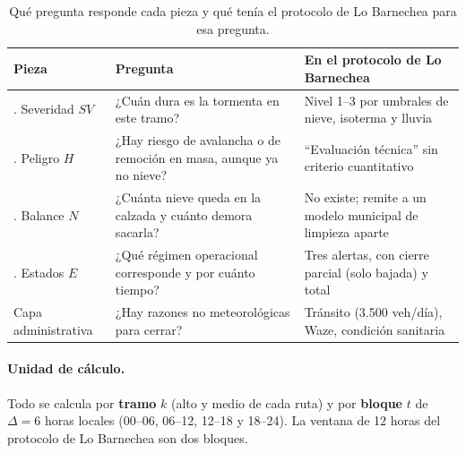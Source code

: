 \begin{table}[ht]
\centering\small
\caption{Qué pregunta responde cada pieza y qué tenía el protocolo de Lo Barnechea para esa pregunta.}
\label{tab:piezas}
\begin{tabularx}{\textwidth}{|>{\raggedright\arraybackslash}p{3.2cm}|>{\raggedright\arraybackslash}X|>{\raggedright\arraybackslash}X|}
\hline
Pieza & Pregunta & En el protocolo de Lo Barnechea \\ \hline
1. Severidad $SV$ & ¿Cuán dura es la tormenta en este tramo? & Nivel 1--3 por umbrales de nieve, isoterma y lluvia \\ \hline
2. Peligro $H$ & ¿Hay riesgo de avalancha o de remoción en masa, aunque ya no nieve? & ``Evaluación técnica'' sin criterio cuantitativo \\ \hline
3. Balance $N$ & ¿Cuánta nieve queda en la calzada y cuánto demora sacarla? & No existe; remite a un modelo municipal de limpieza aparte \\ \hline
4. Estados $E$ & ¿Qué régimen operacional corresponde y por cuánto tiempo? & Tres alertas, con cierre parcial (solo bajada) y total \\ \hline
Capa administrativa & ¿Hay razones no meteorológicas para cerrar? & Tránsito (3.500 veh/día), Waze, condición sanitaria \\ \hline
\end{tabularx}
\end{table}

\paragraph{Unidad de cálculo.} Todo se calcula por \textbf{tramo} $k$ (alto y medio de cada ruta) y por \textbf{bloque} $t$ de $\Delta = 6$ horas locales (00--06, 06--12, 12--18 y 18--24). La ventana de 12 horas del protocolo de Lo Barnechea son dos bloques.


